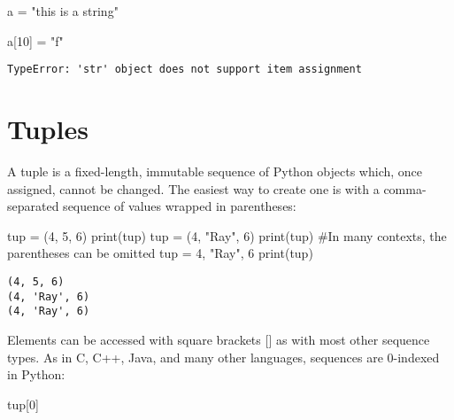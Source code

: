 \documentclass[
  letterpaper,
  DIV=11,
  numbers=noendperiod]{scrreprt}
\newenvironment{Shaded}{\begin{snugshade}}{\end{snugshade}}
\newcommand{\BuiltInTok}[1]{\textcolor[rgb]{0.00,0.23,0.31}{#1}}
\newcommand{\CommentTok}[1]{\textcolor[rgb]{0.37,0.37,0.37}{#1}}
\newcommand{\DecValTok}[1]{\textcolor[rgb]{0.68,0.00,0.00}{#1}}
\newcommand{\NormalTok}[1]{\textcolor[rgb]{0.00,0.23,0.31}{#1}}
\newcommand{\OperatorTok}[1]{\textcolor[rgb]{0.37,0.37,0.37}{#1}}
\newcommand{\StringTok}[1]{\textcolor[rgb]{0.13,0.47,0.30}{#1}}
\begin{document}
\begin{Shaded}
\begin{Highlighting}[]
\NormalTok{a }\OperatorTok{=} \StringTok{"this is a string"}

\NormalTok{a[}\DecValTok{10}\NormalTok{] }\OperatorTok{=} \StringTok{"f"}
\end{Highlighting}
\end{Shaded}

\begin{verbatim}
TypeError: 'str' object does not support item assignment
\end{verbatim}

\hypertarget{tuples}{%
\section{Tuples}\label{tuples}}

A tuple is a fixed-length, immutable sequence of Python objects which,
once assigned, cannot be changed. The easiest way to create one is with
a comma-separated sequence of values wrapped in parentheses:

\begin{Shaded}
\begin{Highlighting}[]
\NormalTok{tup }\OperatorTok{=}\NormalTok{ (}\DecValTok{4}\NormalTok{, }\DecValTok{5}\NormalTok{, }\DecValTok{6}\NormalTok{)}
\BuiltInTok{print}\NormalTok{(tup)}
\NormalTok{tup }\OperatorTok{=}\NormalTok{ (}\DecValTok{4}\NormalTok{, }\StringTok{"Ray"}\NormalTok{, }\DecValTok{6}\NormalTok{)}
\BuiltInTok{print}\NormalTok{(tup)}
\CommentTok{\#In many contexts, the parentheses can be omitted}
\NormalTok{tup }\OperatorTok{=} \DecValTok{4}\NormalTok{, }\StringTok{"Ray"}\NormalTok{, }\DecValTok{6}
\BuiltInTok{print}\NormalTok{(tup)}
\end{Highlighting}
\end{Shaded}

\begin{verbatim}
(4, 5, 6)
(4, 'Ray', 6)
(4, 'Ray', 6)
\end{verbatim}

Elements can be accessed with square brackets {[}{]} as with most other
sequence types. As in C, C++, Java, and many other languages, sequences
are 0-indexed in Python:

\begin{Shaded}
\begin{Highlighting}[]
\NormalTok{tup[}\DecValTok{0}\NormalTok{]}
\end{Highlighting}
\end{Shaded}
\end{document}
